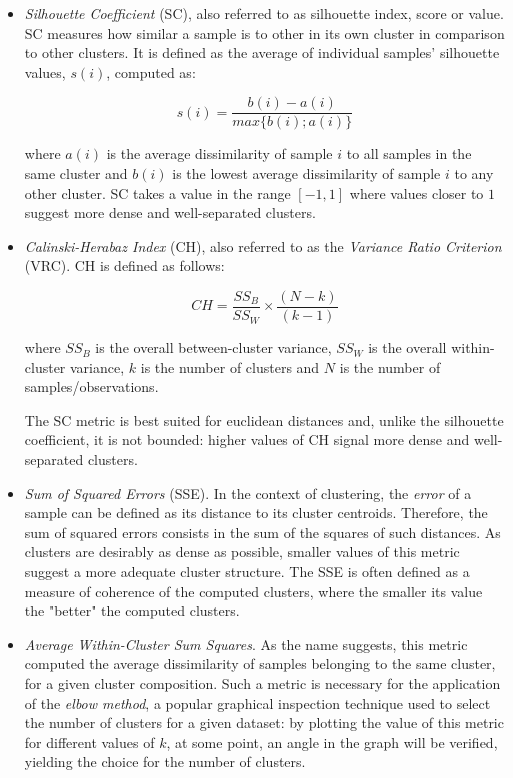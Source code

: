 \documentclass[9pt,journal,compsoc]{IEEEtran}
\begin{document}
\begin{itemize}
	\item \emph{Silhouette Coefficient} (SC), also referred to as silhouette index, score or value. SC measures how similar a sample is to other in its own cluster in comparison to other clusters. It is defined as the average of individual samples' silhouette values, $s(i)$, computed as:
	
	$$s(i) = \frac{b(i) - a(i)}{max\{b(i); a(i)\}} $$
	
	where $a(i)$ is the average dissimilarity of sample $i$ to all samples in the same cluster and $b(i)$ is the lowest average dissimilarity of sample $i$ to any other cluster. SC takes a value in the range $[-1, 1]$ where values closer to $1$ suggest more dense and well-separated clusters.
	
	\vspace{0.3cm}
	
	\item \emph{Calinski-Herabaz Index} (CH), also referred to as the \emph{Variance Ratio Criterion} (VRC). CH is defined as follows:
	
	$$CH = \frac{SS_{B}}{SS_{W}} \times \frac{(N - k)}{(k - 1)}$$
	
	where $SS_{B}$ is the overall between-cluster variance, $SS_{W}$ is the overall within-cluster variance, $k$ is the number of clusters and $N$ is the number of samples/observations.
	
	The SC metric is best suited for euclidean distances and, unlike the silhouette coefficient, it is not bounded: higher values of CH signal more dense and well-separated clusters.
	
	\vspace{0.3cm}
	
	\item \emph{Sum of Squared Errors} (SSE). In the context of clustering, the \emph{error} of a sample can be defined as its distance to its cluster centroids. Therefore, the sum of squared errors consists in the sum of the squares of such distances. As clusters are desirably as dense as possible, smaller values of this metric suggest a more adequate cluster structure. The SSE is often defined as a measure of coherence of the computed clusters, where the smaller its value the "better" the computed clusters.

	\vspace{0.3cm}	
	
	\item \emph{Average Within-Cluster Sum Squares}. As the name suggests, this metric computed the average dissimilarity of samples belonging to the same cluster, for a given cluster composition. Such a metric is necessary for the application of the \emph{elbow method}, a popular graphical inspection technique used to select the number of clusters for a given dataset: by plotting the value of this metric for different values of $k$, at some point, an angle in the graph will be verified, yielding the choice for the number of clusters.
	
\end{itemize}
\end{document}
